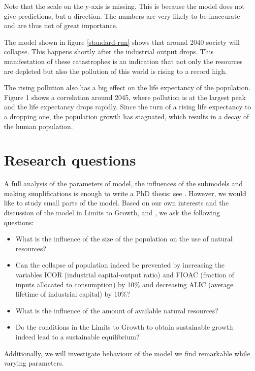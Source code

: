 \documentclass[10pt,a4paper]{scrartcl}
\begin{document}
Note that the scale on the y-axis is missing. This is because the model does not give predictions, but a direction. The numbers are very likely to be inaccurate and are thus not of great importance.

The model shown in figure \ref{standard-run} shows that around 2040 society will collapse. This happens shortly after the industrial output drops. This manifestation of these catastrophes is an indication that not only the resources are depleted but also the pollution of this world is rising to a record high.

The rising pollution also has a big effect on the life expectancy of the population. Figure 1 shows a correlation around 2045, where pollution is at the largest peak and the life expectancy drops rapidly. Since the turn of a rising life expectancy to a dropping one, the population growth has stagnated, which results in a decay of the human population.

\section*{Research questions}

A full analysis of the parameters of model, the influences of the submodels and making simplifications is enough to write a PhD thesis: see \cite{thissen1978investigations}. However, we would like to study small parts of the model. Based on our own interests and the discussion of the model in Limits to Growth, \cite{thissen1978investigations} and \cite{vermeulen1976parameter}, we ask the following questions:

\begin{itemize}
	\item What is the influence of the size of the population on the use of natural resources?
	\item Can the collapse of population indeed be prevented by increasing the variables ICOR (industrial capital-output ratio) and FIOAC (fraction of inputs allocated to consumption) by 10\% and decreasing ALIC (average lifetime of industrial capital) by 10\%?
	\item What is the influence of the amount of available natural resources?
	\item Do the conditions in the Limits to Growth to obtain sustainable growth indeed lead to a sustainable equilibrium?
\end{itemize}

Additionally, we will investigate behaviour of the model we find remarkable while varying parameters.
\end{document}
